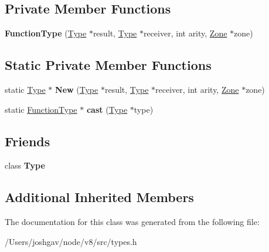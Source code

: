 \subsection*{Private Member Functions}
\begin{DoxyCompactItemize}
\item 
{\bfseries Function\+Type} (\hyperlink{classv8_1_1internal_1_1_type}{Type} $\ast$result, \hyperlink{classv8_1_1internal_1_1_type}{Type} $\ast$receiver, int arity, \hyperlink{classv8_1_1internal_1_1_zone}{Zone} $\ast$zone)\hypertarget{classv8_1_1internal_1_1_function_type_a2aa7dfa29eb89b12fdb1f8a678d966b0}{}\label{classv8_1_1internal_1_1_function_type_a2aa7dfa29eb89b12fdb1f8a678d966b0}

\end{DoxyCompactItemize}
\subsection*{Static Private Member Functions}
\begin{DoxyCompactItemize}
\item 
static \hyperlink{classv8_1_1internal_1_1_type}{Type} $\ast$ {\bfseries New} (\hyperlink{classv8_1_1internal_1_1_type}{Type} $\ast$result, \hyperlink{classv8_1_1internal_1_1_type}{Type} $\ast$receiver, int arity, \hyperlink{classv8_1_1internal_1_1_zone}{Zone} $\ast$zone)\hypertarget{classv8_1_1internal_1_1_function_type_af0ca9fce2cdda7c155b170d799159e1f}{}\label{classv8_1_1internal_1_1_function_type_af0ca9fce2cdda7c155b170d799159e1f}

\item 
static \hyperlink{classv8_1_1internal_1_1_function_type}{Function\+Type} $\ast$ {\bfseries cast} (\hyperlink{classv8_1_1internal_1_1_type}{Type} $\ast$type)\hypertarget{classv8_1_1internal_1_1_function_type_ad87ae050eb3ecaf3733314aeb593c0e9}{}\label{classv8_1_1internal_1_1_function_type_ad87ae050eb3ecaf3733314aeb593c0e9}

\end{DoxyCompactItemize}
\subsection*{Friends}
\begin{DoxyCompactItemize}
\item 
class {\bfseries Type}\hypertarget{classv8_1_1internal_1_1_function_type_a18dba29b4f3e91d6d2bc53472a6bb7cc}{}\label{classv8_1_1internal_1_1_function_type_a18dba29b4f3e91d6d2bc53472a6bb7cc}

\end{DoxyCompactItemize}
\subsection*{Additional Inherited Members}


The documentation for this class was generated from the following file\+:\begin{DoxyCompactItemize}
\item 
/\+Users/joshgav/node/v8/src/types.\+h\end{DoxyCompactItemize}

